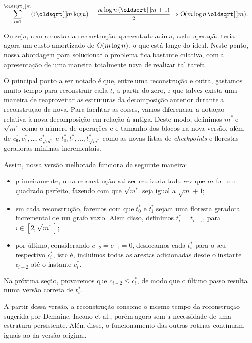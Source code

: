 \begin{equation}
    \sum_{i=1}^{\sqrt{m}} (i \sqrt{m} \log n) =
    \frac{m \log n \: (\sqrt{m} + 1)}{2} \Rightarrow
    \Oh(m \log n \sqrt{m}).
\end{equation}

Ou seja, com o custo da reconstrução apresentado acima, cada operação teria agora um custo amortizado de $\mathrm{O}(m \log n)$, o que está longe do ideal. Neste ponto, nossa abordagem para solucionar o problema fica bastante criativa, com a apresentação de uma maneira totalmente nova de realizar tal tarefa.

O principal ponto a ser notado é que, entre uma reconstrução e outra, gastamos muito tempo para reconstruir cada $t_i$ a partir do zero, e que talvez exista uma maneira de reaproveitar as estruturas da decomposição anterior durante a reconstrução da nova. Para facilitar as coisas, vamos diferenciar a notação relativa à nova decomposição em relação à antiga. Deste modo, definimos $m^*$ e $\sqrt{m^*}$ como o número de operações e o tamanho dos blocos na nova versão, além de $c_0^*, c_1^*, \dots, c_{\sqrt{m^*}}^*$ e $t_0^*, t_1^*, \dots, t_{\sqrt{m^*}}^*$ como as novas listas de \emph{checkpoints} e florestas geradoras mínimas incrementais.

Assim, nossa versão melhorada funciona da seguinte maneira:

\begin{itemize}
    \item primeiramente, uma reconstrução vai ser realizada toda vez que $m$ for um quadrado perfeito, fazendo com que $\sqrt{m^*} $ seja igual a $\sqrt{m} + 1$;
    \item em cada reconstrução, faremos com que $t_0^*$ e $t_1^*$ sejam uma floresta geradora incremental de um grafo vazio. Além disso, definimos $t_i^* = t_{i-2}$, para $i \in [2, \sqrt{m^*}]$;
    \item por último, considerando $c_{-2} = c_{-1} = 0$, deslocamos cada $t_i^*$ para o seu respectivo $c_i^*$, isto é, incluímos todas as arestas adicionadas desde o instante $c_{i-2}$ até o instante $c_i^*$.
\end{itemize}

Na próxima seção, provaremos que $c_{i-2} \leq c^*_i$, de modo que o último passo resulta numa versão correta de $t_i^*$.

A partir dessa versão, a reconstrução consome o mesmo tempo da reconstrução sugerida por Demaine, Iacono et al., porém agora sem a necessidade de uma estrutura persistente. Além disso, o funcionamento das outras rotinas continuam iguais ao da versão original.

